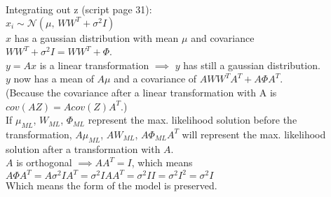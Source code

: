 %
\begin{flushleft}
Integrating out z (script page 31):\\
$x_i \sim \mathcal{N}(\mu, \, W W^{T} + \sigma^{2}I)$\\
$x$ has a gaussian distribution with mean $\mu$ and covariance 
$W W^{T} + \sigma^{2}I = W W^{T} + \Phi$.\\
$y = Ax$ is a linear transformation $\implies$ $y$ has still a gaussian distribution.\\
$y$ now has a mean of $A\mu$ and a covariance of $AW W^{T}A^{T} + A \Phi A^{T}$.\\
(Because the covariance after a linear transformation with A is $cov(AZ)=Acov(Z)A^{T}$.)\\
If $\mu_{ML}$, $W_{ML}$, $\Phi_{ML}$ represent the max. likelihood solution before the transformation, $A\mu_{ML}$, $AW_{ML}$, $A\Phi_{ML}A^{T}$ will represent the max. likelihood solution after a transformation with $A$.\\
$A$ is orthogonal $\implies AA^{T}=I$, which means $A \Phi A^{T} = A \sigma^{2}I A^{T} = \sigma^{2}I A A^{T} = \sigma^{2}I I = \sigma^{2}I^{2} = \sigma^{2}I$\\
Which means the form of the model is preserved.

\end{flushleft}
%
%




